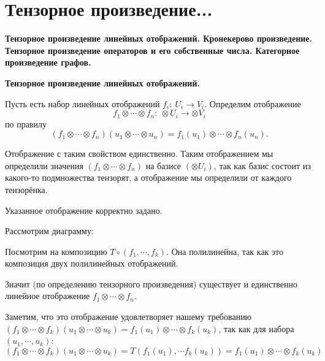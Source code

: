 \section{
 Тензорное произведение... %
}

\textbf{Тензорное произведение линейных отображений. Кронекерово произведение. Тензорное произведение операторов и его собственные числа. Категорное произведение графов.}

\dfn
	{\bf Тензорное произведение линейных отображений.}

	Пусть есть набор линейных отображений $f_i:\ U_i\to V_i$. Определим отображение
	$$
	f_1\otimes\cdots\otimes f_n:\ \otimes U_i\to\otimes V_i
	$$
	по правилу
	$$
	(f_1\otimes\cdots\otimes f_n)(u_1\otimes\cdots\otimes u_n) = f_1(u_1)\otimes\cdots\otimes f_n(u_n).
	$$
\edfn

\lm
	Отображение с таким свойством единственно.
	\proof
		Таким отображением мы определили значения $(f_1\otimes \cdots\otimes f_n)$ на базисе $(\otimes U_i)$, так как базис состоит из какого-то подмножества тензорят, а отображение мы определили от каждого тензорёнка.
	\endproof
\elm

\lm Указанное отображение корректно задано.

	\proof

		Рассмотрим диаграмму:
\begin{center}
\end{center}

		Посмотрим на композицию $T\circ (f_1, \cdots, f_k)$. Она полилинейна, так как это композиция двух полилинейных отображений.

		Значит (по определению тензорного произведения) существует и единственно линейное отображение $f_1\otimes\cdots\otimes f_n$. 

		Заметим, что это отображение удовлетворяет нашему требованию $(f_1\otimes\cdots\otimes f_k)(u_1\otimes\cdots\otimes u_k) = f_1(u_1)\otimes\cdots\otimes f_k(u_k)$, так как для набора $(u_1,\cdots,u_k)$: $(f_1\otimes\cdots\otimes f_k)(u_1\otimes\cdots\otimes u_k) = T(f_1(u_1),\cdots f_k(u_k)) = f_1(u_1)\otimes\cdots\otimes f_k(u_k)$ 
	\endproof
\elm

